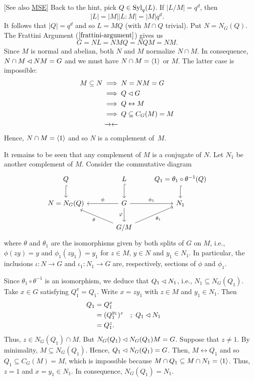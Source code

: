 \begin{solution} {[See also \href{https://math.stackexchange.com/a/617987/269050}{MSE}]}
Back to the hint, pick $Q\in{\rm Syl}_q(L)$. If $|L/M|=q^d$, then
$$
    |L| = |M||L:M| = |M|q^d.
$$
It follows that $|Q|=q^d$ and so $L=MQ$ (with $M\cap Q$ trivial). Put $N=N_G(Q)$. The Frattini Argument ($\ref{frattini-argument}$) gives us
$$
    G=NL=NMQ= NQM= NM.
$$
Since $M$ is normal and abelian, both $N$ and $M$ normalize $N\cap M$. In consequence, $N\cap M\lhd NM=G$ and we must have $N\cap M=\langle1\rangle$ or $M$. The latter case is impossible:
\begin{align*}
    M \subseteq N &\implies N=NM=G\\
        &\implies Q\lhd G\\
        &\implies Q\leftrightarrow M\\
        &\implies Q\subseteq C_G(M)=M\\
        &\to\leftarrow
\end{align*}
Hence, $N\cap M=\langle1\rangle$ and so $N$ is a complement of~$M$. 

It remains to be seen that any complement of $M$ is a conjugate of $N$. Let $N_1$ be another complement of $M$. Consider the commutative diagram
$$
    \begin{tikzcd}
        Q \arrow[d, hook] &[0.2in] L \arrow[d, hook]
            & Q_1=\theta_1\circ\theta^{-1}(Q) \arrow[d, hook] \\
        N=N_G(Q)
            & G \arrow[d, "\varphi"'] \arrow[r, "\phi_1"] \arrow[l, "\phi"']
            & N_1\\
            & G/M \arrow[ru, "\theta_1"'] \arrow[lu, "\theta"]
    \end{tikzcd}
$$
where $\theta$ and $\theta_1$ are the isomorphisms given by both splits of $G$ on $M$, i.e., $\phi(zy)=y$ and $\phi_1(zy_1)=y_1$ for $z\in M$, $y\in N$ and $y_1\in N_1$. In particular, the inclusions $\iota\colon N\to G$ and $\iota_1\colon N_1\to G$ are, respectively, sections of $\phi$ and $\phi_1$.

Since $\theta_1\circ\theta^{-1}$ is an isomorphism, we deduce that $Q_1\lhd N_1$, i.e., $N_1\subseteq N_G(Q_1)$. Take $x\in G$ satisfying $Q_1^x=Q_1$. Write $x=zy_1$ with $z\in M$ and $y_1\in N_1$. Then
\begin{align*}
    Q_1 &= Q_1^x\\
        &= (Q_1^{y_1})^z    &&;\ Q_1\lhd N_1\\
        &= Q_1^z.
\end{align*}
Thus, $z\in N_G(Q_1)\cap M$. But $N_G(Q_1)\lhd N_G(Q_1)M=G$. Suppose that $z\ne1$. By minimality, $M\subseteq N_G(Q_1)$. Hence, $Q_1\lhd N_G(Q_1)=G$. Then, $M\leftrightarrow Q_1$ and so $Q_1\subseteq C_G(M)=M$, which is impossible because $M\cap Q_1\subseteq M\cap N_1=\langle1\rangle$. Thus, $z=1$ and $x=y_1\in N_1$. In consequence, $N_G(Q_1)=N_1$.


\end{solution}
